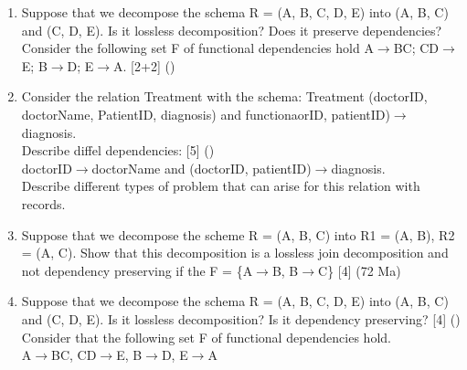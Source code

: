 \documentclass[12pt]{article}
\newcommand{\ra}{\rightarrow}
\begin{document}
\begin{enumerate}[noitemsep, topsep = 0pt]
        \item Suppose that we decompose the schema R = (A, B, C, D, E) into (A, B, C) and (C, D, E). Is it lossless decomposition? Does it preserve dependencies? Consider the following set F of functional dependencies hold A$\ra$BC; CD$\ra$E; B$\ra$D; E$\ra$A. \hfill [2+2] ()
        
        \item Consider the relation Treatment with the schema: Treatment (doctorID, doctorName, PatientID, diagnosis) and functionaorID, patientID)$\ra$diagnosis.\\
        Describe diffel dependencies: \hfill [5] ()\\
        doctorID$\ra$doctorName and (doctorID, patientID)$\ra$diagnosis.\\
        Describe different types of problem that can arise for this relation with records.
        
        \item Suppose that we decompose the scheme R = (A, B, C) into R1 = (A, B), R2 = (A, C). Show that this decomposition is a lossless join decomposition and not dependency preserving if the F = \{A$\ra$B, B$\ra$C\} \hfill [4] (72 Ma)
        
        \item Suppose that we decompose the schema R = (A, B, C, D, E) into (A, B, C) and (C, D, E). Is it lossless decomposition? Is it dependency preserving? \hfill [4] ()\\
        Consider that the following set F of functional dependencies hold.\\
        A$\ra$BC, CD$\ra$E, B$\ra$D, E$\ra$A 
    \end{enumerate}
\end{document}
